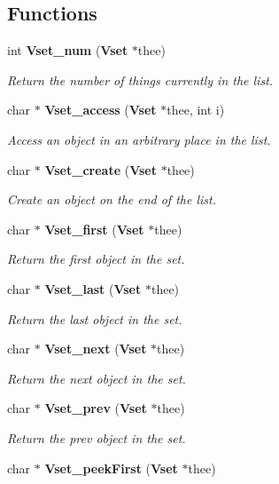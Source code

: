 \subsection*{Functions}
\begin{DoxyCompactItemize}
\item 
int {\bf Vset\-\_\-num} ({\bf Vset} $\ast$thee)
\begin{DoxyCompactList}\small\item\em Return the number of things currently in the list. \end{DoxyCompactList}\item 
char $\ast$ {\bf Vset\-\_\-access} ({\bf Vset} $\ast$thee, int i)
\begin{DoxyCompactList}\small\item\em Access an object in an arbitrary place in the list. \end{DoxyCompactList}\item 
char $\ast$ {\bf Vset\-\_\-create} ({\bf Vset} $\ast$thee)
\begin{DoxyCompactList}\small\item\em Create an object on the end of the list. \end{DoxyCompactList}\item 
char $\ast$ {\bf Vset\-\_\-first} ({\bf Vset} $\ast$thee)
\begin{DoxyCompactList}\small\item\em Return the first object in the set. \end{DoxyCompactList}\item 
char $\ast$ {\bf Vset\-\_\-last} ({\bf Vset} $\ast$thee)
\begin{DoxyCompactList}\small\item\em Return the last object in the set. \end{DoxyCompactList}\item 
char $\ast$ {\bf Vset\-\_\-next} ({\bf Vset} $\ast$thee)
\begin{DoxyCompactList}\small\item\em Return the next object in the set. \end{DoxyCompactList}\item 
char $\ast$ {\bf Vset\-\_\-prev} ({\bf Vset} $\ast$thee)
\begin{DoxyCompactList}\small\item\em Return the prev object in the set. \end{DoxyCompactList}\item 
char $\ast$ {\bf Vset\-\_\-peek\-First} ({\bf Vset} $\ast$thee)

\end{DoxyCompactItemize}
